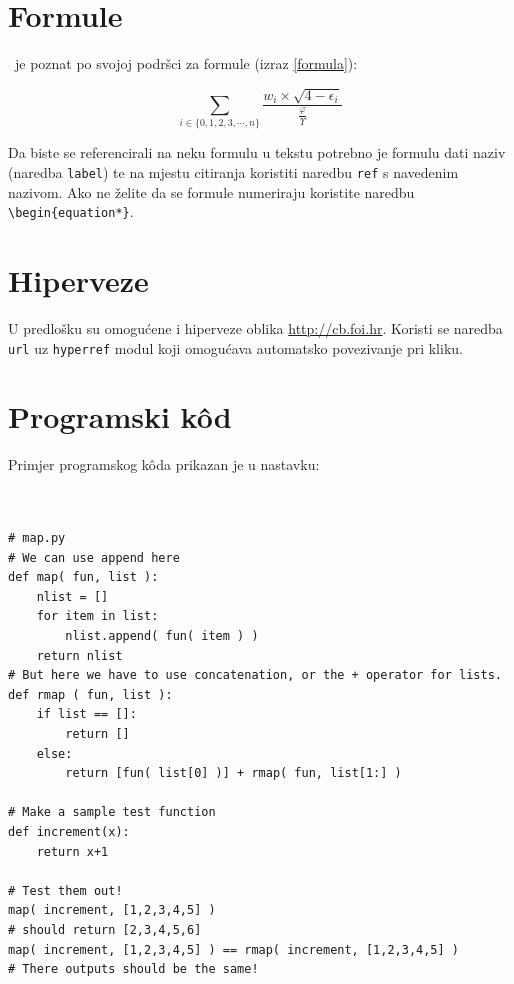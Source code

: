 \documentclass[a4paper,12pt]{foi}
\begin{document}
\chapter{Formule}

\LaTeXe\ je poznat po svojoj podršci za formule (izraz \ref{formula}):

\begin{equation}
 \label{formula}
 \displaystyle\sum_{i \in \{ 0, 1, 2, 3, \cdots, n\}}{\frac{w_i \times \sqrt{4 - \epsilon_i}}{\frac{\varphi}{\Upsilon}}}
\end{equation}

Da biste se referencirali na neku formulu u tekstu potrebno je formulu dati naziv (naredba \texttt{label}) te na mjestu citiranja koristiti naredbu \texttt{ref} s navedenim nazivom. Ako ne želite da se formule numeriraju koristite naredbu \texttt{\textbackslash begin\{equation*\}}.

\chapter{Hiperveze}

U predlošku su omogućene i hiperveze oblika \url{http://cb.foi.hr}. Koristi se naredba \texttt{url} uz \texttt{hyperref} modul koji omogućava automatsko povezivanje pri kliku.

\chapter{Programski kôd}

Primjer programskog kôda prikazan je u nastavku:

\begin{verbatim}


# map.py
# We can use append here
def map( fun, list ):
    nlist = []
    for item in list:
        nlist.append( fun( item ) )
    return nlist
# But here we have to use concatenation, or the + operator for lists.
def rmap ( fun, list ):
    if list == []:
        return []
    else:
        return [fun( list[0] )] + rmap( fun, list[1:] )

# Make a sample test function
def increment(x):
    return x+1

# Test them out!
map( increment, [1,2,3,4,5] )
# should return [2,3,4,5,6]
map( increment, [1,2,3,4,5] ) == rmap( increment, [1,2,3,4,5] )
# There outputs should be the same!
\end{verbatim}
\end{document}
